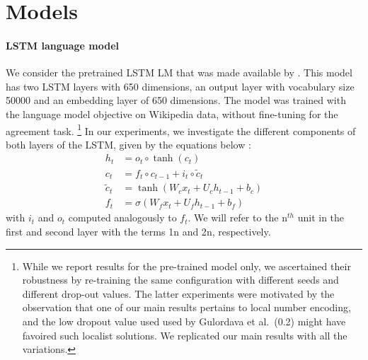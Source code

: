 
\section{Models}


\paragraph{LSTM language model}\label{ssec:lstm_lm}

We consider the pretrained LSTM LM that was made available by \cite{Gulordava:etal:2018}.
This model has two LSTM layers with 650 dimensions, an output layer with vocabulary size 50000 and an embedding layer of 650 dimensions. 
The model was trained with the language model objective on Wikipedia data, without fine-tuning for the agreement task.
\footnote{While we report results for the pre-trained model only, we ascertained their robustness by re-training the same configuration with different seeds and different drop-out values. The latter experiments were motivated by the observation that one of our main results pertains to local number encoding, and the low dropout value used used by Gulordava et al.~(0.2) might have favoired such localist solutions. We replicated our main results with all the variations.} In our experiments, we investigate the different components of both layers of the LSTM, given by the equations below \cite{Hochreiter:Schmidhuber:1997}:
\begin{align}
    h_t & = o_t\circ \tanh(c_t)\\ 
     c_t & = f_t\circ c_{t-1} + i_t\circ \widetilde{c}_t\\
     \widetilde{c}_t & = \tanh(W_cx_t + U_ch_{t-1} + b_c)\\
     f_t & = \sigma(W_fx_t + U_fh_{t-1} + b_f) %
\end{align}
\noindent{}with $i_t$ and $o_t$ computed analogously to $f_t$. We will
refer to the n$^{th}$ unit in the first and second layer with the
terms \unit{1}{n} and \unit{2}{n}, respectively.

